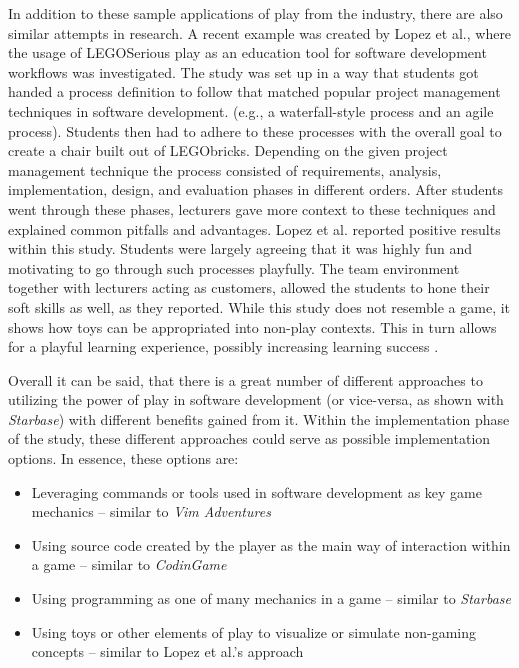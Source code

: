 In addition to these sample applications of play from the industry, there are also similar attempts in research. A recent example was created by Lopez et al., where the usage of LEGO\textregistered Serious play as an education tool for software development workflows was investigated. The study was set up in a way that students got handed a process definition to follow that matched popular project management techniques in software development. (e.g., a waterfall-style process and an agile process). Students then had to adhere to these processes with the overall goal to create a chair built out of LEGO\textregistered bricks. Depending on the given project management technique the process consisted of requirements, analysis, implementation, design, and evaluation phases in different orders. After students went through these phases, lecturers gave more context to these techniques and explained common pitfalls and advantages. Lopez et al. reported positive results within this study. Students were largely agreeing that it was highly fun and motivating to go through such processes playfully. The team environment together with lecturers acting as customers, allowed the students to hone their soft skills as well, as they reported. While this study does not resemble a game, it shows how toys can be appropriated into non-play contexts. This in turn allows for a playful learning experience, possibly increasing learning success \cite{lopez2021lego}.

Overall it can be said, that there is a great number of different approaches to utilizing the power of play in software development (or vice-versa, as shown with \textit{Starbase}) with different benefits gained from it. Within the implementation phase of the study, these different approaches could serve as possible implementation options. In essence, these options are:

\begin{itemize}
  \item{Leveraging commands or tools used in software development as key game mechanics -- similar to \textit{Vim Adventures}}
  \item{Using source code created by the player as the main way of interaction within a game -- similar to \textit{CodinGame}}
  \item{Using programming as one of many mechanics in a game -- similar to \textit{Starbase}}
  \item{Using toys or other elements of play to visualize or simulate non-gaming concepts -- similar to Lopez et al.'s approach}
\end{itemize}

